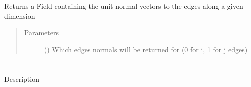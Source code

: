 \documentclass[letterpaper,10pt,english]{sphinxmanual}
\begin{document}
\begin{fulllineitems}
\begin{fulllineitems}
\label{\detokenize{autoapi/CellCenterWS/index:CellCenterWS.CellCenterWS.edge_normals}}
\sphinxAtStartPar
Returns a Field containing the unit normal vectors to the edges along a given dimension
\begin{quote}\begin{description}
\item[{Parameters}] \leavevmode
\sphinxAtStartPar
{} () \textendash{} Which edges normals will be returned for (0 for i, 1 for j edges)

\end{description}\end{quote}

\end{fulllineitems}


\begin{fulllineitems}
\label{\detokenize{autoapi/CellCenterWS/index:CellCenterWS.CellCenterWS.__calc_edges}}
\end{fulllineitems}


\begin{fulllineitems}
\label{\detokenize{autoapi/CellCenterWS/index:CellCenterWS.CellCenterWS.__calc_normals}}
\end{fulllineitems}


\end{fulllineitems}



\section{}
\label{\detokenize{autoapi/Contractinator/index:module-Contractinator}}\label{\detokenize{autoapi/Contractinator/index:contractinator}}\label{\detokenize{autoapi/Contractinator/index::doc}}
\sphinxAtStartPar
Description
\end{document}
